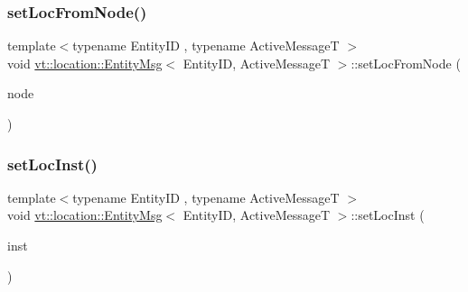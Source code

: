 \subsubsection{\texorpdfstring{set\+Loc\+From\+Node()}{setLocFromNode()}}
{\footnotesize\ttfamily template$<$typename Entity\+ID , typename Active\+MessageT $>$ \\
void \hyperlink{structvt_1_1location_1_1_entity_msg}{vt\+::location\+::\+Entity\+Msg}$<$ Entity\+ID, Active\+MessageT $>$\+::set\+Loc\+From\+Node (\begin{DoxyParamCaption}\item[{\hyperlink{namespacevt_a866da9d0efc19c0a1ce79e9e492f47e2}{Node\+Type} const \&}]{node }\end{DoxyParamCaption})\hspace{0.3cm}{\ttfamily [inline]}}

\mbox{\label{structvt_1_1location_1_1_entity_msg_a7bbd80a3e29d729cd7be84acb167ff90}} 
\subsubsection{\texorpdfstring{set\+Loc\+Inst()}{setLocInst()}}
{\footnotesize\ttfamily template$<$typename Entity\+ID , typename Active\+MessageT $>$ \\
void \hyperlink{structvt_1_1location_1_1_entity_msg}{vt\+::location\+::\+Entity\+Msg}$<$ Entity\+ID, Active\+MessageT $>$\+::set\+Loc\+Inst (\begin{DoxyParamCaption}\item[{\hyperlink{namespacevt_1_1location_a4db6456e8024af2d23fc5ae560fef866}{Loc\+Inst\+Type} const \&}]{inst }\end{DoxyParamCaption})\hspace{0.3cm}{\ttfamily [inline]}}

\mbox{\label{structvt_1_1location_1_1_entity_msg_ac7426fc8a8631a33f16b389f489631c2}} 

